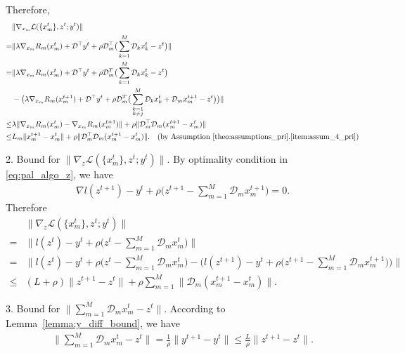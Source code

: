 Therefore,
\begin{align}
    & \|\nabla_{x_m} \mathcal{L}(\{x_m^t\}, z^t; y^t)\|\nonumber\\
    = & \|\lambda\nabla_{x_m}R_m(x_m^{t}) + \mathcal{D}^\top y^t + \rho \mathcal{D}_m^\top \big( \sum_{k=1}^M \mathcal{D}_kx_k^{t} - z^{t}\big)\|\nonumber\\
    = &  \|\lambda\nabla_{x_m}R_m(x_m^{t}) + \mathcal{D}^\top y^t + \rho \mathcal{D}_m^T\big( \sum_{k=1}^M \mathcal{D}_kx_k^{t} - z^{t}\big)\nonumber\\
     & - \big(\lambda\nabla_{x_m}R_m(x_m^{t+1}) + \mathcal{D}^\top y^t + \rho \mathcal{D}_m^T\big(\sum_{\substack{k=1\\k\neq j}}^M \mathcal{D}_kx_k^{t}+ \mathcal{D}_mx_m^{t+1} - z^{t}\big)\big)\|\nonumber\\
    \le &  \lambda\|\nabla_{x_m}R_m(x_m^{t}) - \nabla_{x_m}R_m(x_m^{t+1}) \| + \rho\|\mathcal{D}_m^\top \mathcal{D}_m(x_m^{t+1} - x_m^t)\|\nonumber\\
    \le & L_m\| x_m^{t+1} - x_m^t \|  + \rho\|\mathcal{D}_m^\top \mathcal{D}_m(x_m^{t+1} - x_m^t)\|. \quad\text{(by Assumption~\ref{theo:assumptions_pri}.\ref{item:assum_4_pri})}\label{eq:proof_pal_bound_V_2}
\end{align}

2. Bound for $\|\nabla_{z} \mathcal{L}(\{x_m^t\}, z^t; y^t)\|$. By optimality condition in \eqref{eq:pal_algo_z}, we have
\begin{align}
    \nabla l(z^{t+1}) - y^t + \rho\big(z^{t+1} - \sum_{m=1}^M \mathcal{D}_m x_m^{t+1}\big) = 0.\nonumber
\end{align}
Therefore
\begin{align}
        & \|\nabla_{z} \mathcal{L}(\{x_m^t\}, z^t; y^t)\|\nonumber\\
        = & \| l(z^{t}) - y^t + \rho\big(z^{t} - \sum_{m=1}^M \mathcal{D}_m x_m^{t}\big) \|\nonumber\\
        = & \|l(z^{t}) - y^t + \rho\big(z^{t} - \sum_{m=1}^M \mathcal{D}_m x_m^{t}\big) - \big(l(z^{t+1}) - y^t + \rho\big(z^{t+1} - \sum_{m=1}^M \mathcal{D}_m x_m^{t+1}\big)\big)\|\nonumber\\
        \le & (L+\rho)\|z^{t+1} - z^{t}\| + \rho\sum_{m=1}^M\|\mathcal{D}_m(x_m^{t+1}-x_m^{t})\|.\label{eq:proof_pal_bound_V_3}
\end{align}

3. Bound for $\|\sum_{m=1}^M \mathcal{D}_mx_m^t - z^t\|$. According to Lemma~\ref{lemma:y_diff_bound}, we have
\begin{align}
     \|\sum_{m=1}^M \mathcal{D}_mx_m^t - z^t\| = \frac{1}{\rho}\|y^{t+1}-y^t\| \le \frac{L}{\rho}\|z^{t+1}-z^t\|. \label{eq:proof_pal_bound_V_4}
\end{align}

